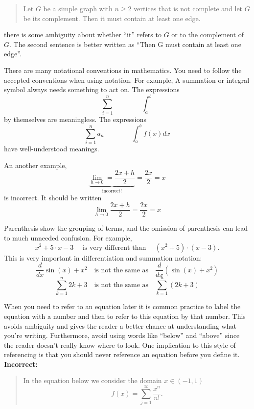 \documentclass[
]{book}
\theoremstyle{definition}
\theoremstyle{definition}
\theoremstyle{definition}
\theoremstyle{remark}
\begin{document}
\begin{description}
\begin{quote}
Let \(G\) be a simple graph with \(n \ge 2\) vertices that is not
complete and let \(G\) be its complement. Then it must contain at
least one edge.
\end{quote}

there is some ambiguity about whether ``it'' refers to \(G\) or to the
complement of \(G\). The second sentence is better written as ``Then G
must contain at least one edge''.
\item[Use Proper Notation:]
There are many notational conventions in mathematics. You need to
follow the accepted conventions when using notation. For example, A
summation or integral symbol always needs something to act on. The
expressions \[\sum_{i=1}^n \qquad \qquad \int_a^b\] by themselves
are meaningless. The expressions
\[\sum_{i=1}^n a_n \qquad \qquad \int_a^b f(x) dx\] have
well-understood meanings.

An another example,
\[\underbrace{\lim_{h \to 0} = \frac{2x+h}{2}}_{\text{incorrect!}} = \frac{2x}{2} = x\]
is incorrect. It should be written
\[\lim_{h \to 0} \frac{2x+h}{2} = \frac{2x}{2} = x\]
\item[Parenthesis are important:]
Parenthesis show the grouping of terms, and the omission of
parenthesis can lead to much unneeded confusion. For example,
\[x^2 + 5 \cdot x-3 \quad \text{ is very different than } \quad \left( x^2 + 5
            \right) \cdot \left( x-3 \right).\] This is very
important in differentiation and summation notation:
\[\frac{d}{dx} \sin(x) + x^2 \quad \text{is not the same as} \quad \frac{d}{dx}
            \left( \sin(x) + x^2 \right)\]
\[\sum_{k=1}^n 2k+3 \quad \text{is not the same as} \quad \sum_{k=1}^n \left(
            2k+3 \right)\]
\item[Label and reference equations:]
When you need to refer to an equation later it is common practice to
label the equation with a number and then to refer to this equation
by that number. This avoids ambiguity and gives the reader a better
chance at understanding what you're writing. Furthermore, avoid
using words like ``below'' and ``above'' since the reader doesn't really
know where to look. One implication to this style of referencing is
that you should never reference an equation before you define it.\\
\textbf{Incorrect:}

\begin{quote}
In the equation below we consider the domain \(x \in (-1,1)\)
\[f(x) = \sum_{j=1}^\infty \frac{x^n}{n!}.\]
\end{quote}


\end{description}
\end{document}
